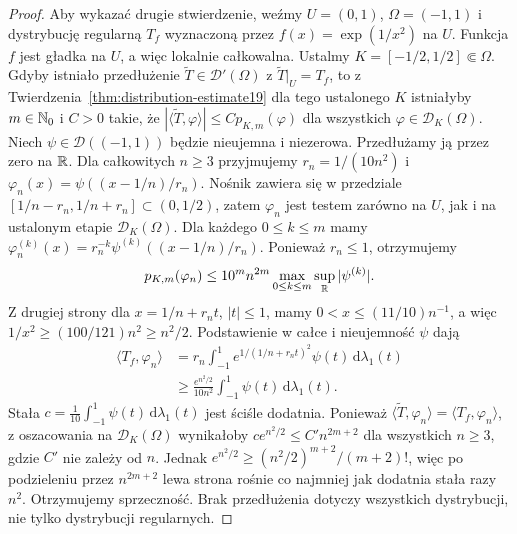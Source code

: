 \begin{proof}
Aby wykazać drugie stwierdzenie, weźmy
$U=(0,1)$, $\Omega=(-1,1)$ i dystrybucję regularną
$T_f$ wyznaczoną przez $f(x)=\exp(1/x^2)$ na $U$.
Funkcja $f$ jest gładka na $U$, a więc lokalnie
całkowalna. Ustalmy $K=[-1/2,1/2]\Subset\Omega$.
Gdyby istniało przedłużenie
$\widetilde T\in\mathcal D'(\Omega)$ z
$\widetilde T|_U=T_f$, to z
Twierdzenia~\ref{thm:distribution-estimate19}
dla tego ustalonego $K$ istniałyby $m\in\mathbb N_0$
i $C>0$ takie, że
$|\langle\widetilde T,\varphi\rangle|\le C p_{K,m}(\varphi)$
dla wszystkich $\varphi\in\mathcal D_K(\Omega)$.
Niech $\psi\in\mathcal D((-1,1))$ będzie nieujemna
i niezerowa. Przedłużamy ją przez zero na $\mathbb R$.
Dla całkowitych $n\ge3$ przyjmujemy
$r_n=1/(10n^2)$ i
$\varphi_n(x)=\psi((x-1/n)/r_n)$.
Nośnik zawiera się w przedziale
$[1/n-r_n,1/n+r_n]\subset(0,1/2)$, zatem
$\varphi_n$ jest testem zarówno na $U$, jak i na
ustalonym etapie $\mathcal D_K(\Omega)$.
Dla każdego $0\le k\le m$ mamy
$\varphi_n^{(k)}(x)=r_n^{-k}\psi^{(k)}((x-1/n)/r_n)$.
Ponieważ $r_n\le1$, otrzymujemy
\[
 p_{K,m}(\varphi_n)
 \le 10^m n^{2m}\max_{0\le k\le m}
 \sup_{\mathbb R}|\psi^{(k)}|.
\]
Z drugiej strony dla $x=1/n+r_nt$, $|t|\le1$,
mamy $0<x\le(11/10)n^{-1}$, a więc
$1/x^2\ge(100/121)n^2\ge n^2/2$.
Podstawienie w całce i nieujemność $\psi$ dają
\[
 \begin{aligned}
 \langle T_f,\varphi_n\rangle
 &=r_n\int_{-1}^1 e^{1/(1/n+r_nt)^2}\psi(t)\,
 \mathrm d\lambda_1(t)\\
 &\ge \frac{e^{n^2/2}}{10n^2}
 \int_{-1}^1\psi(t)\,\mathrm d\lambda_1(t).
 \end{aligned}
\]
Stała $c=\frac1{10}\int_{-1}^1\psi(t)\,\mathrm d\lambda_1(t)$
jest ściśle dodatnia. Ponieważ
$\langle\widetilde T,\varphi_n\rangle=
\langle T_f,\varphi_n\rangle$, z oszacowania na
$\mathcal D_K(\Omega)$ wynikałoby
$c e^{n^2/2}\le C' n^{2m+2}$ dla wszystkich $n\ge3$,
gdzie $C'$ nie zależy od $n$. Jednak
$e^{n^2/2}\ge (n^2/2)^{m+2}/(m+2)!$,
więc po podzieleniu przez $n^{2m+2}$ lewa strona
rośnie co najmniej jak dodatnia stała razy $n^2$.
Otrzymujemy sprzeczność. Brak przedłużenia dotyczy
wszystkich dystrybucji, nie tylko dystrybucji regularnych.
\end{proof}
